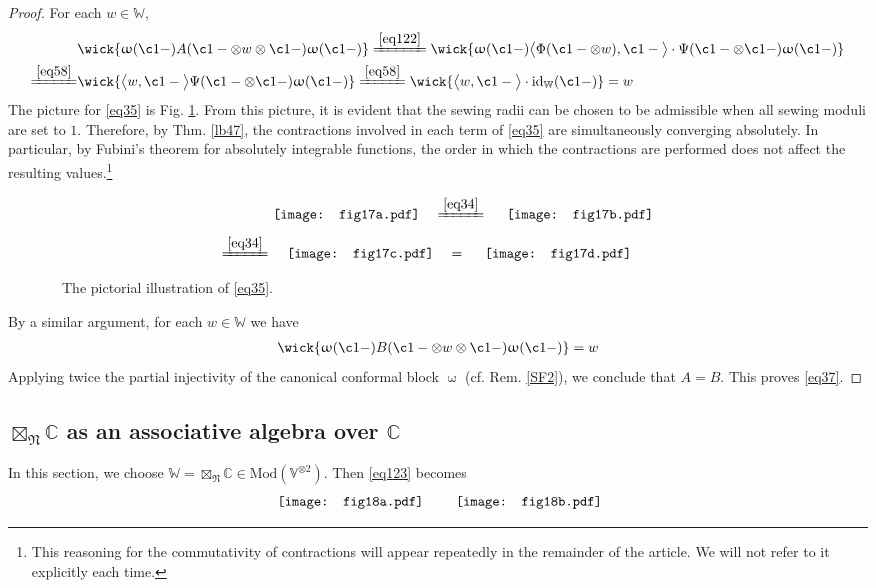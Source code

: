 \documentclass[11pt,b5paper,notitlepage]{article}
\theoremstyle{definition}
\theoremstyle{plain}
\newcommand{\Vbb}{\mathbb V}
\newcommand{\Wbb}{\mathbb W}
\newcommand{\Cbb}{\mathbb C}
\newcommand{\<}{\left\langle}
\renewcommand{\>}{\right\rangle}
\newcommand{\Mod}{\mathrm{Mod}}
\newcommand{\id}{\mathrm{id}}
\newcommand{\fn}{\mathfrak{N}}
\newcommand{\Lan}{{\big\langle}}
\newcommand{\Ran}{{\big\rangle}}
\numberwithin{equation}{section}
\begin{document}
\begin{proof}
For each $w\in \Wbb$,
\begin{align}
&\wick{\upomega(\c1 -)A(\c1 -\otimes w\otimes \c1 -)\upomega(\c1 -)}\xlongequal{\eqref{eq122}}\wick{\upomega(\c1 -)\Lan \Phi(\c1 -\otimes w), \c1 -\Ran\cdot \Psi(\c1 -\otimes \c1 -)\upomega(\c1 -)}\nonumber\\
\xlongequal{\eqref{eq58}}&\wick{\Lan w,\c1 -\Ran\Psi(\c1 -\otimes \c1 -)\upomega(\c1 -)}\xlongequal{\eqref{eq58}}\wick{\Lan w,\c1 -\Ran\cdot \id_\Wbb(\c1-)}=w \label{eq35}
\end{align}
The picture for \eqref{eq35} is Fig. \ref{img2}. From this picture, it is evident that the sewing radii can be chosen to be admissible when all sewing moduli are set to $1$. Therefore, by Thm. \ref{lb47}, the contractions involved in each term of \eqref{eq35} are simultaneously converging absolutely. In particular, by Fubini's theorem for absolutely integrable functions, the order in which the contractions are performed does not affect the resulting values.\footnote{This reasoning for the commutativity of contractions will appear repeatedly in the remainder of the article. We will not refer to it explicitly each time.}
\begin{figure}[h]
	\centering
\begin{align*}
&\vcenter{\hbox{{
		   \texttt{[image: fig17a.pdf]}}}}\quad\xlongequal{\eqref{eq34}}\quad \vcenter{\hbox{{
		   \texttt{[image: fig17b.pdf]}}}}\\[1ex]
\xlongequal{\eqref{eq34}}&\quad\vcenter{\hbox{{
		   \texttt{[image: fig17c.pdf]}}}}\quad = \quad \vcenter{\hbox{{
		   \texttt{[image: fig17d.pdf]}}}}
\end{align*}
\caption{~~The pictorial illustration of \eqref{eq35}.}
	\label{img2}
\end{figure}


By a similar argument, for each $w\in \Wbb$ we have
\begin{align*}
	\wick{\upomega(\c1 -)B(\c1 -\otimes w\otimes \c1 -)\upomega(\c1 -)}=w
\end{align*}
Applying twice the partial injectivity of the canonical conformal block $\upomega$ (cf. Rem. \ref{SF2}), we conclude that $A=B$. This proves \eqref{eq37}.
\end{proof}







\subsection{$\boxtimes_\fn\Cbb$ as an associative algebra over $\Cbb$}
In this section, we choose $\Wbb=\boxtimes_\fn\Cbb\in \Mod(\Vbb^{\otimes 2})$. Then \eqref{eq123} becomes
\begin{align}\label{eq39}
   \vcenter{\hbox{{
		\texttt{[image: fig18a.pdf]}}}}\qquad \vcenter{\hbox{{
		   \texttt{[image: fig18b.pdf]}}}}
\end{align}
\end{document}
